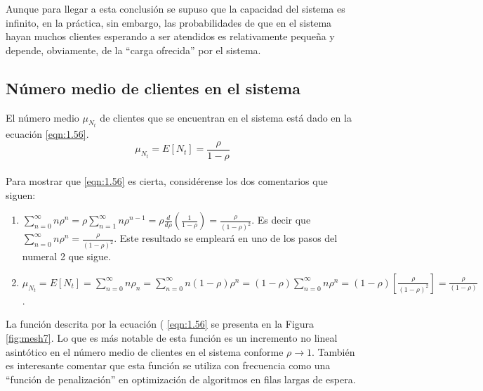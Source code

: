 Aunque para llegar a esta conclusión se supuso que la capacidad del sistema es infinito, en la práctica, sin embargo, las probabilidades de que en el sistema hayan muchos clientes esperando a ser atendidos es relativamente pequeña y depende, obviamente, de la “carga ofrecida” por el sistema.

\subsection{Número medio de clientes en el sistema}
El número medio $ \mu_{N_{t}} $ de clientes que se encuentran en el sistema está dado en la ecuación \ref{eqn:1.56}.
\begin{equation}
    \mu_{N_{t}}=E\left [ N_{t} \right ]=\frac{\rho}{1-\rho}
    \label{eqn:1.56}
\end{equation}
\\
Para mostrar que \ref{eqn:1.56} es cierta, considérense los dos comentarios que siguen:

\begin{enumerate}
    \item $\displaystyle\sum_{n=0}^{\infty }n\rho^{n}=\rho\sum_{n=1}^{\infty }n\rho^{n-1}=\rho\frac{d}{d\rho}\left ( \frac{1}{1-\rho} \right )=\frac{\rho}{\left ( 1-\rho \right )^{2}} $. Es decir que $ \displaystyle\sum_{n=0}^{\infty }n\rho^{n}=\frac{\rho}{\left ( 1-\rho \right )^{2}} $. Este resultado se empleará en uno de los pasos del numeral 2 que sigue.
    \item $ \mu_{N_{t}}=E\left [ N_{t} \right ]=\displaystyle\sum_{n=0}^{\infty }n\rho_{n}=\sum_{n=0}^{\infty }n\left ( 1-\rho \right )\rho^{n}=\left ( 1-\rho \right )\sum_{n=0}^{\infty }n\rho^{n}= \left ( 1-\rho \right )\left [ \frac{\rho}{\left ( 1-\rho \right )^{2}} \right ]=\frac{\rho}{\left ( 1-\rho \right )} $.
\end{enumerate}

La función descrita por la ecuación ( \ref{eqn:1.56} se presenta en la Figura \ref{fig:mesh7}. Lo que es más notable de esta función es un incremento no lineal asintótico en el número medio de clientes en el sistema conforme $ \rho \to 1 $. También es interesante comentar que esta función se utiliza con frecuencia como una “función de penalización” en optimización de algoritmos en filas largas de espera.

